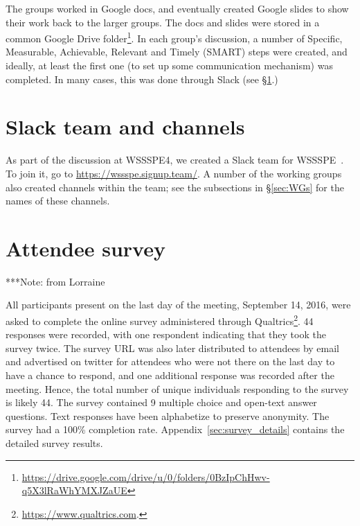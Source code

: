 \documentclass[11pt, oneside]{amsart}
\newcommand{\todo}[1]{{\color{blue}$\blacksquare$~\textsf{[TODO: #1]}}}
\newcommand{\note}[1]{ {\textcolor{blueish}    { ***Note:      #1 }}}
\begin{document}
The groups worked in Google docs, and eventually created Google slides to show their work back to the larger groups. The docs and slides were stored in a common Google Drive folder\footnote{\url{https://drive.google.com/drive/u/0/folders/0BzIpChHwv-q5X3lRaWhYMXJZaUE}}. In each group's discussion, a number of Specific, Measurable, Achievable, Relevant and Timely (SMART) steps were created, and ideally, at least the first one (to set up some communication mechanism) was completed.  In many cases, this was done through Slack (see \S\ref{sec:slack}.)
















\section{Slack team and channels}\label{sec:slack}


As part of the discussion at WSSSPE4, we created a Slack team for WSSSPE~\cite{WSSSPESlack}.  To join it, go to \url{https://wssspe.signup.team/}.  A number of the working groups also created channels within the team; see the subsections in \S\ref{sec:WGs} for the names of these channels.


\section{Attendee survey \label{sec:survey}}

\note{from Lorraine}

All participants present on the last day of the meeting, September 14, 2016, were asked to complete the online survey administered through Qualtrics\footnote{\url{https://www.qualtrics.com}.}.
44 responses were recorded, with one respondent indicating that they took the survey twice.
The survey URL was also later distributed to attendees by email and advertised on twitter for attendees who were not there on the last day to have a chance to respond, and one additional response was recorded after the meeting.
Hence, the total number of unique individuals responding to the survey is likely 44.
The survey contained 9 multiple choice and open-text answer questions.
Text responses have been alphabetize to preserve anonymity.
The survey had a 100\% completion rate.
Appendix~\ref{sec:survey_details} contains the detailed survey results.
\end{document}
